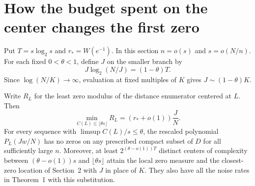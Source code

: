 \section{How the budget spent on the center changes the first zero}
Put $T=s\log_2 s$ and $r_*=W(e^{-1})$. In this section $n=o(s)$ and $s=o(N/n)$.
For each fixed $0<\theta<1$, define $J$ on the smaller branch by
\[
                J\log_2(N/J)=(1-\theta)T .
\]
Since $\log(N/K)\to\infty$, evaluation at fixed multiples of $K$ gives $J\sim(1-\theta)K$.
\begin{theorem}\label{th:profile}
Write $R_L$ for the least zero modulus of the distance enumerator centered at $L$. Then
\[
 \min_{C(L)\le\lfloor\theta s\rfloor}R_L
      =(r_*+o(1))\frac{J}{N}.
\]
For every sequence with $\limsup C(L)/s\le\theta$, the rescaled polynomial $P_L(Jw/N)$ has no zeros on any prescribed compact subset of $D$ for all sufficiently large $n$. Moreover, at least $2^{(\theta-o(1))T}$ distinct centers of complexity between $(\theta-o(1))s$ and $\lfloor\theta s\rfloor$ attain the local zero measure and the closest-zero location of Section~2 with $J$ in place of $K$. They also have all the noise rates in Theorem~1 with this substitution.
\end{theorem}
